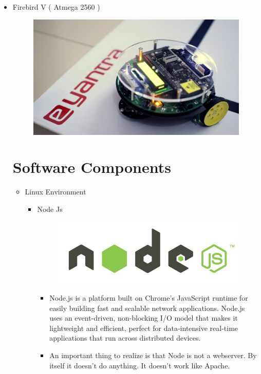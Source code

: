 \documentclass[a4paper,12pt,oneside]{book}
\begin{document}
\begin{itemize}
  \item Firebird V ( Atmega 2560 )
  \begin{figure}[h]
    \centering
	\includegraphics[scale=0.1]{firebird.jpg}
	\end{figure}
  
  
  \newpage
\section{Software Components}
  
  
  \begin{itemize}
  \item Linux Environment 
    \begin{itemize}
     \item Node Js
   
    \begin{figure}[h]
    \centering
	\includegraphics[scale=0.4]{nodejs.png}
	\end{figure}
   
    \begin{itemize}
    \item Node.js is a platform built on Chrome's JavaScript runtime for easily building fast and scalable network applications. Node.js uses an event-driven, non-blocking I/O model that makes it lightweight and efficient, perfect for data-intensive real-time applications that run across distributed devices.
	\item An important thing to realize is that Node is not a webserver. By itself it doesn't do anything. It doesn't work like Apache. 
    \end{itemize}
  

\end{itemize}
\end{itemize}
\end{itemize}
\end{document}
